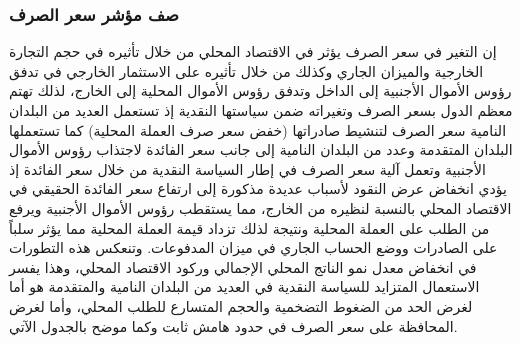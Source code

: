 \documentclass[10pt,a4paper]{report}
\begin{document}
\begin{doublespacing}
\subsubsection{صف مؤشر سعر الصرف}
إن التغير في سعر الصرف يؤثر في الاقتصاد المحلي من خلال تأثيره في حجم التجارة الخارجية والميزان الجاري وكذلك من خلال تأثيره على الاستثمار الخارجي في تدفق رؤوس الأموال الأجنبية إلى الداخل وتدفق رؤوس الأموال المحلية إلى الخارج، لذلك تهتم معظم الدول بسعر الصرف وتغيراته ضمن سياستها النقدية إذ تستعمل العديد من البلدان النامية سعر الصرف لتنشيط صادراتها (خفض سعر صرف العملة المحلية) كما تستعملها البلدان المتقدمة وعدد من البلدان النامية إلى جانب سعر الفائدة لاجتذاب رؤوس الأموال الأجنبية وتعمل آلية سعر الصرف في إطار السياسة النقدية من خلال سعر الفائدة إذ يؤدي انخفاض عرض النقود لأسباب عديدة مذكورة إلى ارتفاع سعر الفائدة الحقيقي في الاقتصاد المحلي بالنسبة لنظيره من الخارج، مما يستقطب رؤوس الأموال الأجنبية ويرفع من الطلب على العملة المحلية ونتيجة لذلك تزداد قيمة العملة المحلية مما يؤثر سلباً على الصادرات ووضع الحساب الجاري في ميزان المدفوعات. وتنعكس هذه التطورات في انخفاض معدل نمو الناتج المحلي الإجمالي وركود الاقتصاد المحلي، وهذا يفسر الاستعمال المتزايد للسياسة النقدية في العديد من البلدان النامية والمتقدمة هو أما لغرض الحد من الضغوط التضخمية والحجم المتسارع للطلب المحلي، وأما لغرض المحافظة على سعر الصرف في حدود هامش ثابت وكما موضح بالجدول الآتي.
\begin{table}[H]
	\captionsetup{font=Large}  %
	\fontsize{14}{12}\selectfont
	\centering
	\caption{سعر الصرف في العراق للمدة 2010-2021}
	\label{tab:10.3}
\end{table}
\end{doublespacing}
\end{document}
